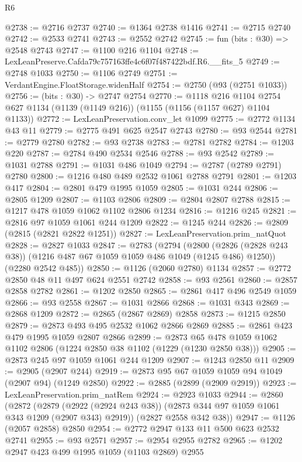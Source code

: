 \begin{lexlean}{R6}
\begin{coremodule}
@2738 := @2716 @2737
@2740 := @1364 @2738 @1416
@2741 := @2715 @2740
@2742 := @2533 @2741
@2743 := @2552 @2742
@2745 := fun (bits : @30) => @2548 @2743
@2747 := @1100 @216 @1104
@2748 := LexLeanPreserve.Cafda79c757163ffe4c6f07f487422bdf.R6.__fits_5
@2749 := @2748 @1033
@2750 := @1106 @2749
@2751 := VerdantEngine.FloatStorage.widenHalf
@2754 := @2750 (@93 (@2751 @1033))
@2756 := (bits : @30) -> @2747 @2754
@2770 := @1118
    @216
    @1104
    @2754
    @627
    @1134
    (@1139 (@1149 @216))
    (@1155 (@1156 (@1157 @627) @1104 @1133))
@2772 := LexLeanPreservation.conv_let @1099
@2775 := @2772 @1134 @43 @11
@2779 := @2775 @491 @625 @2547 @2743
@2780 := @93 @2544
@2781 := @2779 @2780
@2782 := @93 @2738
@2783 := @2781 @2782
@2784 := @1203 @220
@2787 := @2784 @490 @2534 @2546
@2788 := @93 @2542
@2789 := @1031 @2788
@2791 := @1031 @486 @1049
@2794 := @2787 (@2789 @2791) @2780
@2800 := @1216 @480 @489 @2532 @1061 @2788 @2791
@2801 := @1203 @417
@2804 := @2801 @479 @1995 @1059
@2805 := @1031 @244
@2806 := @2805 @1209
@2807 := @1103 @2806
@2809 := @2804 @2807 @2788
@2815 := @1217 @478 @1059 @1062 @1102 @2806 @1234
@2816 := @1216 @245
@2821 := @2816 @97 @1059 @1061 @244 @1209
@2822 := @1245 @244
@2826 := @2809 (@2815 (@2821 @2822 @1251))
@2827 := LexLeanPreservation.prim_natQuot
@2828 := @2827 @1033
@2847 := @2783
    (@2794
      (@2800 (@2826 (@2828 @243 @38)) (@1216 @487 @67 @1059 @1059 @486 @1049 (@1245 @486) @1250))
      (@2280 @2542 @485))
@2850 := @1126 (@2060 @2780) @1134
@2857 := @2772 @2850 @48 @11 @497 @624 @2551 @2742
@2858 := @93 @2561
@2860 := @2857 @2858 @2782
@2861 := @1202 @2850
@2865 := @2861 @417 @496 @2549 @1059
@2866 := @93 @2558
@2867 := @1031 @2866
@2868 := @1031 @343
@2869 := @2868 @1209
@2872 := @2865 (@2867 @2869) @2858
@2873 := @1215 @2850
@2879 := @2873 @493 @495 @2532 @1062 @2866 @2869
@2885 := @2861 @423 @479 @1995 @1059 @2807 @2866
@2899 := @2873 @65 @478 @1059 @1062 @1102 @2806 (@1224 @2850 @38 @1102 (@1229 (@1230 @2850 @38)))
@2905 := @2873 @245 @97 @1059 @1061 @244 @1209
@2907 := @1243 @2850 @11
@2909 := @2905 (@2907 @244)
@2919 := @2873 @95 @67 @1059 @1059 @94 @1049 (@2907 @94) (@1249 @2850)
@2922 := @2885 (@2899 (@2909 @2919))
@2923 := LexLeanPreservation.prim_natRem
@2924 := @2923 @1033
@2944 := @2860
    (@2872
      (@2879 (@2922 (@2924 @243 @38)) (@2873 @344 @97 @1059 @1061 @343 @1209 (@2907 @343) @2919))
      (@2827 @2558 @342 @38))
@2947 := @1126 (@2057 @2858) @2850
@2954 := @2772 @2947 @133 @11 @500 @623 @2532 @2741
@2955 := @93 @2571
@2957 := @2954 @2955 @2782
@2965 := @1202 @2947 @423 @499 @1995 @1059 (@1103 @2869) @2955

\end{coremodule}
\end{lexlean}
